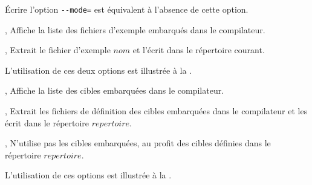 Écrire l'option \texttt{-{}-mode=} est équivalent à l'absence de cette option.







,  Affiche la liste des fichiers d'exemple embarqués dans le compilateur.

,  Extrait le fichier d'exemple $nom$ et l'écrit dans le répertoire courant.

L'utilisation de ces deux options est illustrée à la .







,  Affiche la liste des cibles embarquées dans le compilateur.

,  Extrait les fichiers de définition des cibles embarquées dans le compilateur et les écrit dans le répertoire $repertoire$.

,  N'utilise pas les cibles embarquées, au profit des cibles définies dans le répertoire $repertoire$.

L'utilisation de ces options est illustrée à la .
